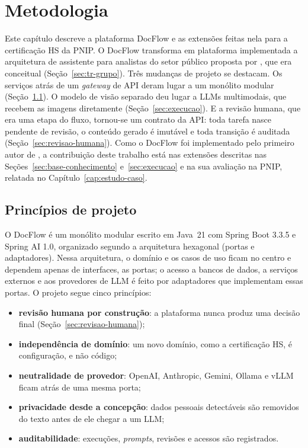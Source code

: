 \chapter{Metodologia}
\label{cap:metodologia}

Este capítulo descreve a plataforma DocFlow e as extensões feitas nela para a certificação HS da PNIP. O DocFlow transforma em plataforma implementada a arquitetura de assistente para analistas do setor público proposta por , que era conceitual (Seção~\ref{sec:tr-grupo}). Três mudanças de projeto se destacam. Os serviços atrás de um \textit{gateway} de API deram lugar a um monólito modular (Seção~\ref{sec:principios}). O modelo de visão separado deu lugar a LLMs multimodais, que recebem as imagens diretamente (Seção~\ref{sec:execucao}). E a revisão humana, que era uma etapa do fluxo, tornou-se um contrato da API: toda tarefa nasce pendente de revisão, o conteúdo gerado é imutável e toda transição é auditada (Seção~\ref{sec:revisao-humana}). Como o DocFlow foi implementado pelo primeiro autor de , a contribuição deste trabalho está nas extensões descritas nas Seções~\ref{sec:base-conhecimento} e~\ref{sec:execucao} e na sua avaliação na PNIP, relatada no Capítulo~\ref{cap:estudo-caso}.

\section{Princípios de projeto}
\label{sec:principios}

O DocFlow é um monólito modular escrito em Java~21 com Spring Boot 3.3.5 e Spring AI 1.0, organizado segundo a arquitetura hexagonal (portas e adaptadores). Nessa arquitetura, o domínio e os casos de uso ficam no centro e dependem apenas de interfaces, as portas; o acesso a bancos de dados, a serviços externos e aos provedores de LLM é feito por adaptadores que implementam essas portas. O projeto segue cinco princípios:

\begin{itemize}
	\item \textbf{revisão humana por construção}: a plataforma nunca produz uma decisão final (Seção~\ref{sec:revisao-humana});
	\item \textbf{independência de domínio}: um novo domínio, como a certificação HS, é configuração, e não código;
	\item \textbf{neutralidade de provedor}: OpenAI, Anthropic, Gemini, Ollama e vLLM ficam atrás de uma mesma porta;
	\item \textbf{privacidade desde a concepção}: dados pessoais detectáveis são removidos do texto antes de ele chegar a um LLM;
	\item \textbf{auditabilidade}: execuções, \textit{prompts}, revisões e acessos são registrados.
\end{itemize}

